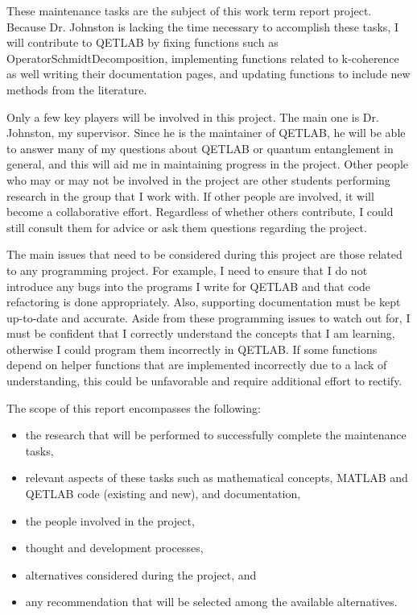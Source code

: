 \documentclass[12pt]{article}
\begin{document}
These maintenance tasks are the subject of this work term report project. Because Dr. Johnston is lacking the time necessary to accomplish these tasks, I will contribute to QETLAB by fixing functions such as OperatorSchmidtDecomposition, implementing functions related to k-coherence as well writing their documentation pages, and updating functions to include new methods from the literature.

Only a few key players will be involved in this project. The main one is Dr. Johnston, my supervisor. Since he is the maintainer of QETLAB, he will be able to answer many of my questions about QETLAB or quantum entanglement in general, and this will aid me in maintaining progress in the project. Other people who may or may not be involved in the project are other students performing research in the group that I work with. If other people are involved, it will become a collaborative effort. Regardless of whether others contribute, I could still consult them for advice or ask them questions regarding the project.

The main issues that need to be considered during this project are those related to any programming project. For example, I need to ensure that I do not introduce any bugs into the programs I write for QETLAB and that code refactoring is done appropriately. Also, supporting documentation must be kept up-to-date and accurate. Aside from these programming issues to watch out for, I must be confident that I correctly understand the concepts that I am learning, otherwise I could program them incorrectly in QETLAB. If some functions depend on helper functions that are implemented incorrectly due to a lack of understanding, this could be unfavorable and require additional effort to rectify.

The scope of this report encompasses the following:
\begin{itemize}
    \item the research that will be performed to successfully complete the maintenance tasks,
    \item relevant aspects of these tasks such as mathematical concepts, MATLAB and QETLAB code (existing and new), and documentation,
    \item the people involved in the project,
    \item thought and development processes,
    \item alternatives considered during the project, and
    \item any recommendation that will be selected among the available alternatives.
\end{itemize}
\end{document}
